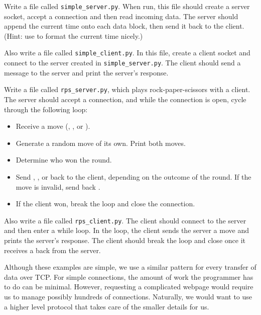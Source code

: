 \begin{problem} %
Write a file called \texttt{simple\_server.py}.
When run, this file should create a server socket, accept a connection and then read incoming data.
The server should append the current time onto each data block, then send it back to the client.\\
(Hint: use  to format the current time nicely.)

Also write a file called \texttt{simple\_client.py}.
In this file, create a client socket and connect to the server created in \texttt{simple\_server.py}.
The client should send a message to the server and print the server's response.
\end{problem}

\newpage

\begin{problem} %
Write a file called \texttt{rps\_server.py}, which plays rock-paper-scissors with a client.
The server should accept a connection, and while the connection is open, cycle through the following loop:
\begin{itemize}
	\item Receive a move (, , or ).
	\item Generate a random move of its own. Print both moves.
	\item Determine who won the round.
	\item Send , , or  back to the client, depending on the outcome of the round.
    If the move is invalid, send back .
	\item If the client won, break the loop and close the connection.
\end{itemize}

Also write a file called \texttt{rps\_client.py}.
The client should connect to the server and then enter a while loop.
In the loop, the client sends the server a move and prints the server's response.
The client should break the loop and close once it receives a  back from the server.
\end{problem}

Although these examples are simple, we use a similar pattern for every transfer of data over TCP.
For simple connections, the amount of work the programmer has to do can be minimal.
However, requesting a complicated webpage would require us to manage possibly hundreds of connections.
Naturally, we would want to use a higher level protocol that takes care of the smaller details for us.

